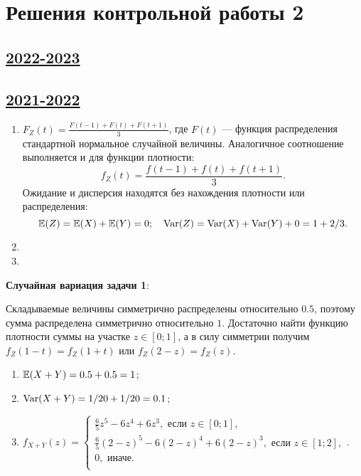 \thispagestyle{empty}
\section{Решения контрольной работы 2}


\subsection[2022-2023]{\hyperref[sec:sol_kr_02_2022_2023]{2022-2023}}
\label{sec:sol_kr_02_2022_2023}



\subsection[2021-2022]{\hyperref[sec:sol_kr_02_2021_2022]{2021-2022}}
\label{sec:sol_kr_02_2021_2022}

\begin{enumerate}
	\item $F_Z(t) = \frac{F(t-1) + F(t) + F(t+1)}{3}$, где $F(t)$ — функция распределения стандартной нормальное случайной величины.
	Аналогичное соотношение выполняется и для функции плотности:
	\[
	f_Z(t) = \frac{f(t-1) + f(t) + f(t+1)}{3}.
	\]
	Ожидание и дисперсия находятся без нахождения плотности или распределения:
	\[
	\operatorname{\mathbb{E}}(Z) = \operatorname{\mathbb{E}}(X) + \operatorname{\mathbb{E}}(Y) = 0; \quad \operatorname{Var}(Z) = \operatorname{Var}(X) + \operatorname{Var}(Y) + 0 = 1 + 2/3.  
	\]
	\item 
	\item 
  \end{enumerate}
  

  \textbf{Случайная вариация задачи 1}:

  Складываемые величины симметрично распределены относительно $0.5$, поэтому сумма распределена симметрично относительно $1$. 
  Достаточно найти функцию плотности суммы на участке $z\in [0;1]$, а в силу симметрии получим $f_Z(1- t) = f_Z(1 + t)$ 
  или $f_Z(2-z) = f_Z(z)$.

  \begin{enumerate}
    \item $\operatorname{\mathbb{E}}(X+Y) = 0.5 + 0.5 = 1$;
    \item $\operatorname{Var}(X+Y) = 1/20 + 1/20 = 0.1$;
    \item $f_{X+Y}(z) = \begin{cases}
	\frac{6}{5}z^5 - 6z^4 + 6z^3, \text{ если } z \in [0;1], \\
	\frac{6}{5}(2-z)^5 - 6(2-z)^4 + 6(2-z)^3, \text{ если } z \in [1;2], \\
	0, \text{ иначе.} \\
	\end{cases}$.
\end{enumerate}


